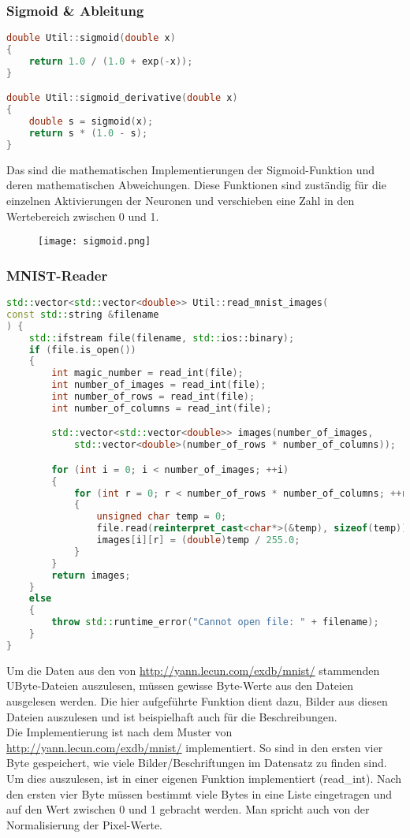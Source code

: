 \subsubsection{Sigmoid \& Ableitung}
\label{sec:RealSigmoidAbleitungCode}
\begin{lstlisting}[language=c++]
double Util::sigmoid(double x) 
{
	return 1.0 / (1.0 + exp(-x));
}

double Util::sigmoid_derivative(double x)
{
	double s = sigmoid(x);
	return s * (1.0 - s);
}
\end{lstlisting}
Das sind die mathematischen Implementierungen der Sigmoid-Funktion und deren mathematischen Abweichungen. Diese Funktionen sind zuständig für die einzelnen Aktivierungen der Neuronen und verschieben eine Zahl in den Wertebereich zwischen 0 und 1.
\begin{figure}[H]
	\centering
		\texttt{[image: sigmoid.png]}
	\label{fig:sigmoid}
\end{figure}


\subsubsection{MNIST-Reader}
\label{sec:RealMNISTReaderCode}
\begin{lstlisting}[language=c++]
std::vector<std::vector<double>> Util::read_mnist_images(
const std::string &filename
) {
	std::ifstream file(filename, std::ios::binary);
	if (file.is_open()) 
	{
		int magic_number = read_int(file);
		int number_of_images = read_int(file);
		int number_of_rows = read_int(file);
		int number_of_columns = read_int(file);

		std::vector<std::vector<double>> images(number_of_images, 
			std::vector<double>(number_of_rows * number_of_columns));

		for (int i = 0; i < number_of_images; ++i) 
		{
			for (int r = 0; r < number_of_rows * number_of_columns; ++r) 
			{
				unsigned char temp = 0;
				file.read(reinterpret_cast<char*>(&temp), sizeof(temp));
				images[i][r] = (double)temp / 255.0;
			}
		}
		return images;
	} 
	else 
	{
		throw std::runtime_error("Cannot open file: " + filename);
	}
}
\end{lstlisting}
Um die Daten aus den von \url{http://yann.lecun.com/exdb/mnist/} stammenden UByte-Dateien auszulesen, müssen gewisse Byte-Werte aus den Dateien ausgelesen werden. Die hier aufgeführte Funktion dient dazu, Bilder aus diesen Dateien auszulesen und ist beispielhaft auch für die Beschreibungen.
\\
Die Implementierung ist nach dem Muster von \url{http://yann.lecun.com/exdb/mnist/} implementiert. So sind in den ersten vier Byte gespeichert, wie viele Bilder/Beschriftungen im Datensatz zu finden sind. Um dies auszulesen, ist in einer eigenen Funktion implementiert (read\_int). Nach den ersten vier Byte müssen bestimmt viele Bytes in eine Liste eingetragen und auf den Wert zwischen 0 und 1 gebracht werden. Man spricht auch von der Normalisierung der Pixel-Werte.
